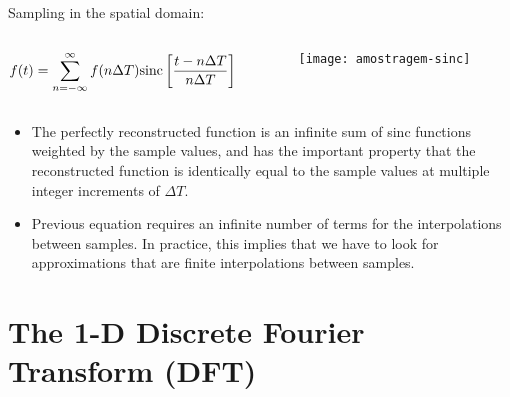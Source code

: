 
\begin{frame}
Sampling in the spatial domain:
\begin{columns}
\begin{column}{.5\textwidth}
\begin{equation}
f(t) = \sum_{n=-\infty}^{\infty} f(n\Delta T) \text{sinc}\left [ \dfrac{t - n\Delta T}{n\Delta T} \right ] \notag
\end{equation}
\end{column}
\begin{column}{.5\textwidth}
\begin{figure}
\centering
\texttt{[image: amostragem-sinc]}
\end{figure}
\end{column}
\end{columns}
\end{frame}

\begin{frame}
\begin{itemize}
\item The perfectly reconstructed function is an infinite sum of sinc functions weighted by the sample values, and has the important property that the reconstructed function is identically equal to the sample values at multiple integer increments of $\Delta T$.
\item Previous equation requires an infinite number of terms for the interpolations between samples. In practice, this implies that we have to look for approximations that are finite interpolations between samples.
\end{itemize}
\end{frame}


\section{The 1-D Discrete Fourier Transform (DFT)}


